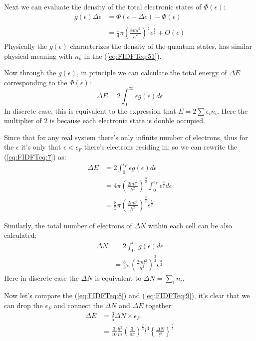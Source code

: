 Next we can evaluate the density of the total electronic states of
$\Phi(\epsilon)$:
\begin{align}
  \label{eq:FIDFTeq:6}
  g(\epsilon)\Delta\epsilon &= \Phi(\epsilon + \Delta\epsilon) -
  \Phi(\epsilon) \nonumber \\
  &=\frac{1}{4}\pi
    \left(\frac{8ml^{2}}{h^{2}}\right)^{\frac{3}{2}}\epsilon^{\frac{1}{2}}
    + O(\epsilon)
\end{align}
Physically the $g(\epsilon)$ characterizes the density of the
quantum states, has similar physical meaning with $n_{k}$ in the
(\ref{eq:FIDFTeq:51}).

Now through the $g(\epsilon)$, in principle we can calculate the total
energy of $\Delta E$ corresponding to the $\Phi(\epsilon)$:
\begin{equation}
  \label{eq:FIDFTeq:7}
  \Delta E = 2\int^{\infty}_{0}\epsilon g(\epsilon)d\epsilon
\end{equation}
In discrete case, this is equivalent to the expression that $E =
2\sum\epsilon_{i}n_{i}$. Here the multiplier of $2$ is because each
electronic state is double occupied.

Since that for any real system there's only infinite number of
electrons, thus for the $\epsilon$ it's only that $\epsilon <
\epsilon_{F}$ there's electrons residing in; so we can rewrite the
(\ref{eq:FIDFTeq:7}) as:
\begin{align}
  \label{eq:FIDFTeq:8}
    \Delta E &= 2\int^{\epsilon_{F}}_{0}\epsilon g(\epsilon)d\epsilon
    \nonumber \\
    &= 4\pi
    \left(\frac{2ml^{2}}{h^{2}}\right)^{\frac{3}{2}}\int^{\epsilon_{F}}_{0}
    \epsilon^{\frac{3}{2}}d\epsilon \nonumber \\
    &= \frac{8}{5}\pi
    \left(\frac{2ml^{2}}{h^{2}}\right)^{\frac{3}{2}}\epsilon^{\frac{5}{2}}
\end{align}

Similarly, the total number of electrons of $\Delta N$ within each
cell can be also calculated:
\begin{align}
  \label{eq:FIDFTeq:9}
      \Delta N &= 2\int^{\epsilon_{F}}_{0} g(\epsilon)d\epsilon
      \nonumber \\
      &= \frac{8}{3}\pi
    \left(\frac{2ml^{2}}{h^{2}}\right)^{\frac{3}{2}}\epsilon^{\frac{3}{2}}
\end{align}
Here in discrete case the $\Delta N$ is equivalent to $\Delta N =
\sum_{i}n_{i}$.

Now let's compare the (\ref{eq:FIDFTeq:8}) and (\ref{eq:FIDFTeq:9}),
it's clear that we can drop the $\epsilon_{F}$ and connect the $\Delta
N$ and $\Delta E$ together:
\begin{align}
  \label{eq:FIDFTeq:10}
  \Delta E &= \frac{3}{5}\Delta N \times \epsilon_{F} \nonumber \\
  &=\frac{3}{10}\frac{h^{2}}{m}\left(\frac{3}{8\pi}\right)^{\frac{2}{3}}
l^{3}\left\{\frac{\Delta N}{l^{3}}\right\}^{\frac{5}{3}}
\end{align}

